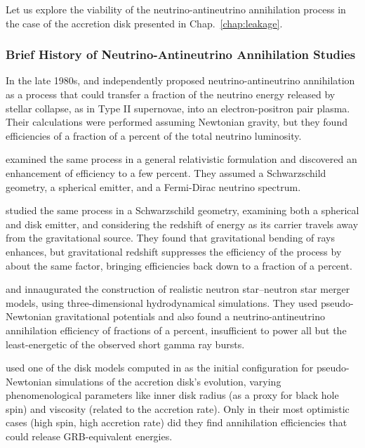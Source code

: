 Let us explore the viability of the neutrino-antineutrino annihilation process
in the case of the accretion disk presented in Chap.~\ref{chap:leakage}.

\subsubsection{Brief History of Neutrino-Antineutrino Annihilation Studies}
\label{sssc:nunubar_review}
In the late 1980s, \cite{good1987-nunubar} and \cite{bere1987-nunubar}
independently proposed neutrino-antineutrino annihilation as a process that could
transfer a fraction of the neutrino energy released by stellar collapse, as in
Type II supernovae, into an electron-positron pair plasma. Their calculations
were performed assuming Newtonian gravity, but they found efficiencies of a
fraction of a percent of the total neutrino luminosity.

\cite{salm1999-nunubar} examined the same process in a general relativistic
formulation and discovered an enhancement of efficiency to a few percent.
They assumed a Schwarzschild geometry, a spherical emitter, and a Fermi-Dirac
neutrino spectrum.

\cite{asan2000-nunubar} studied the same process in a Schwarzschild geometry,
examining both a spherical and disk emitter, and considering the
redshift of energy as its carrier travels away from the gravitational source.
They found that gravitational bending of rays enhances, but gravitational
redshift suppresses the efficiency of the process by about the same factor,
bringing efficiencies back down to a fraction of a percent.

\cite{ruff1999-nsns_i,ruff1999-nsns_ii,ruff1999-nsns_iii} and
\cite{ross2003-nsns_i,ross2003-nsns_ii,ross2003-nsns_iii} innaugurated the
construction of realistic neutron star--neutron star merger models, using
three-dimensional hydrodynamical simulations.
They used pseudo-Newtonian gravitational potentials and also found a
neutrino-antineutrino annihilation efficiency of fractions of a percent,
insufficient to power all but the least-energetic of the observed
short gamma ray bursts.

\cite{seti2006-nunubar} used one of the disk models computed in
\cite{ruff1999-nsns_i}
as the initial configuration for pseudo-Newtonian simulations of the
accretion disk's evolution, varying phenomenological parameters like inner disk
radius (as a proxy for black hole spin) and viscosity (related to the
accretion rate). Only in their most optimistic cases (high spin, high
accretion rate) did they find annihilation
efficiencies that could release GRB-equivalent energies.

